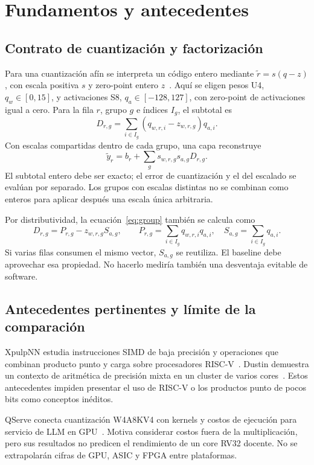\section{Fundamentos y antecedentes}
\subsection{Contrato de cuantización y factorización}
Para una cuantización afín se interpreta un código entero mediante
\(\tilde r=s(q-z)\), con escala positiva \(s\) y zero-point entero \(z\)~\cite{jacob}.
Aquí se eligen pesos U4, \(q_w\in[0,15]\), y activaciones S8,
\(q_a\in[-128,127]\), con zero-point de activaciones igual a cero.
Para la fila \(r\), grupo \(g\) e índices \(I_g\), el subtotal es
\begin{equation}
D_{r,g}=\sum_{i\in I_g}(q_{w,r,i}-z_{w,r,g})q_{a,i}.
\label{eq:group}
\end{equation}
Con escalas compartidas dentro de cada grupo, una capa reconstruye
\begin{equation}
\tilde y_r=b_r+\sum_g s_{w,r,g}s_{a,g}D_{r,g}.
\end{equation}
El subtotal entero debe ser exacto; el error de cuantización y el del escalado
se evalúan por separado. Los grupos con escalas distintas no se combinan
como enteros para aplicar después una escala única arbitraria.

Por distributividad, la ecuación~\eqref{eq:group} también se calcula como
\begin{equation}
D_{r,g}=P_{r,g}-z_{w,r,g}S_{a,g},\qquad
P_{r,g}=\sum_{i\in I_g}q_{w,r,i}q_{a,i},\quad
S_{a,g}=\sum_{i\in I_g}q_{a,i}.
\label{eq:factored}
\end{equation}
Si varias filas consumen el mismo vector, \(S_{a,g}\) se reutiliza. El baseline
debe aprovechar esa propiedad. No hacerlo mediría también una desventaja
evitable de software.

\subsection{Antecedentes pertinentes y límite de la comparación}
XpulpNN estudia instrucciones SIMD de baja precisión y operaciones que
combinan producto punto y carga sobre procesadores RISC-V~\cite{xpulpnn}.
Dustin demuestra un contexto de aritmética de precisión mixta en un cluster
de varios cores~\cite{dustin}. Estos antecedentes impiden presentar el uso
de RISC-V o los productos punto de pocos bits como conceptos inéditos.

QServe conecta cuantización W4A8KV4 con kernels y costos de ejecución para
servicio de LLM en GPU~\cite{qserve}. Motiva considerar costos fuera de la
multiplicación, pero sus resultados no predicen el rendimiento de un core
RV32 docente. No se extrapolarán cifras de GPU, ASIC y FPGA entre plataformas.

